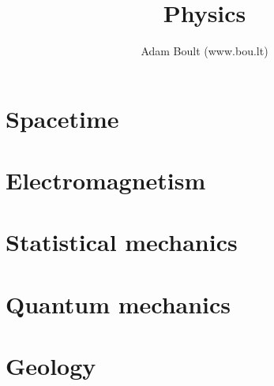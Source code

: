 \documentclass[oneside]{book}
\begin{document}
\author{Adam Boult (www.bou.lt)}
\title{Physics}
\maketitle

\setcounter{tocdepth}{1}
\tableofcontents



\part{Spacetime}







\part{Electromagnetism}


\part{Statistical mechanics}


\part{Quantum mechanics}




\part{Geology}

\end{document}
